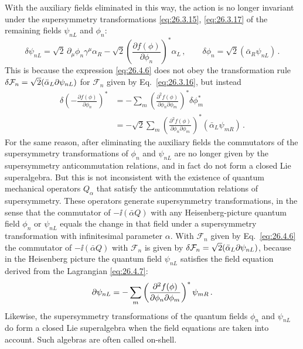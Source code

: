 With the auxiliary fields eliminated in this way, the action is no longer
invariant under the supersymmetry transformations \eqref{eq:26.3.15},
\eqref{eq:26.3.17} of the remaining fields \(\psi_{nL}\) and \(\phi_n\):
\[
  \delta\psi_{nL}
  =\sqrt2\,\partial_\mu\phi_n\gamma^\mu\alpha_R
  -\sqrt2\left(\frac{\partial f(\phi)}{\partial\phi_n}\right)^*\alpha_L\,,
  \qquad
  \delta\phi_n=\sqrt2(\bar\alpha_R\psi_{nL})\,.
\]
This is because the expression \eqref{eq:26.4.6} does not obey the
transformation rule
\(\delta\mathcal{F}_n=\sqrt2(\bar\alpha_L\sl{\partial}\psi_{nL})\) for
\(\mathcal{F}_n\) given by Eq.~\eqref{eq:26.3.16}, but instead
\[
  \begin{aligned}
  \delta\left(-\frac{\partial f(\phi)}{\partial\phi_n}\right)^*
  &=-\sum_m
    \left(\frac{\partial^2f(\phi)}
      {\partial\phi_n\partial\phi_m}\right)^*
    \delta\phi_m^*
  \\
  &=-\sqrt2\sum_m
    \left(\frac{\partial^2f(\phi)}
      {\partial\phi_n\partial\phi_m}\right)^*
    (\bar\alpha_L\psi_{mR})\,.
  \end{aligned}
\]
For the same reason, after eliminating the auxiliary fields the commutators of
the supersymmetry transformations of \(\phi_n\) and \(\psi_{nL}\) are no
longer given by the supersymmetry anticommutation relations, and in fact do
not form a closed Lie superalgebra. But this is not inconsistent with the
existence of quantum mechanical operators \(Q_\alpha\) that satisfy the
anticommutation relations of supersymmetry. These operators generate
supersymmetry transformations, in the sense that the commutator of
\(-\ii(\bar\alpha Q)\) with any Heisenberg-picture quantum field \(\phi_n\) or
\(\psi_{nL}\) equals the change in that field under a supersymmetry
transformation with infinitesimal parameter \(\alpha\). With
\(\mathcal{F}_n\) given by Eq.~\eqref{eq:26.4.6} the commutator of
\(-\ii(\bar\alpha Q)\) with \(\mathcal{F}_n\) is given by
\(\delta\mathcal{F}_n=\sqrt2(\bar\alpha_L\sl{\partial}\psi_{nL})\), because in
the Heisenberg picture the quantum field \(\psi_{nL}\) satisfies the field
equation derived from the Lagrangian \eqref{eq:26.4.7}:
\[
  \sl{\partial}\psi_{nL}
  =-\sum_m
    \left(\frac{\partial^2f(\phi)}
      {\partial\phi_n\partial\phi_m}\right)^*
    \psi_{mR}\,.
\]
Likewise, the supersymmetry transformations of the quantum fields \(\phi_n\)
and \(\psi_{nL}\) do form a closed Lie superalgebra when the field equations
are taken into account. Such algebras are often called on-shell.


